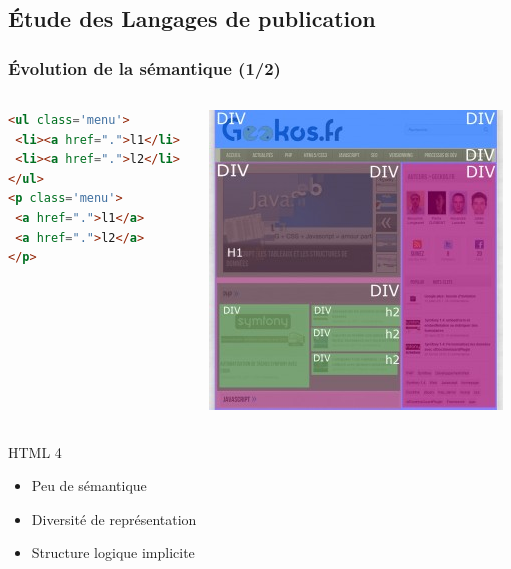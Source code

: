 \documentclass[9pt]{beamer}
\begin{document}
\subsection{Étude des Langages de publication}
\begin{frame}[fragile]
\frametitle{Évolution de la sémantique (1/2)}
\begin{columns}
	\begin{column}{5.5cm}
\begin{lstlisting}[frame=single, language=html]
<ul class='menu'>
 <li><a href=".">l1</li>
 <li><a href=".">l2</li>
</ul>
<p class='menu'>
 <a href=".">l1</a>
 <a href=".">l2</a>
</p>
\end{lstlisting}
	\end{column}
	\begin{column}{5cm}
	\includegraphics[scale=0.4]{img/architecture_HTML4.jpg}	
	\end{column}
\end{columns}
	\begin{block}{HTML 4}
	\begin{itemize}
		\item Peu de sémantique
		\item Diversité de représentation
		\item Structure logique implicite
	\end{itemize}
	\end{block}
\end{frame}
\end{document}

